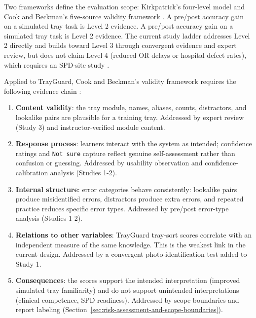 \documentclass[10pt,a4paper]{article}
\begin{document}
Two frameworks define the evaluation scope: Kirkpatrick's four-level model and Cook and Beckman's five-source validity framework \cite{kirkpatrick-evaluation-1994, cook-beckman-validity-2006}. A pre/post accuracy gain on a simulated tray task is Level 2 evidence. A pre/post accuracy gain on a simulated tray task is Level 2 evidence. The current study ladder addresses Level 2 directly and builds toward Level 3 through convergent evidence and expert review, but does not claim Level 4 (reduced OR delays or hospital defect rates), which requires an SPD-site study \cite{arthur-et-al-2003}.

Applied to TrayGuard, Cook and Beckman's validity framework requires the
following evidence chain \cite{cook-beckman-validity-2006}:
\begin{enumerate}
  \item \textbf{Content validity}: the tray module, names, aliases, counts,
  distractors, and lookalike pairs are plausible for a training tray. Addressed
  by expert review (Study 3) and instructor-verified module content.
  \item \textbf{Response process}: learners interact with the system as intended;
  confidence ratings and \texttt{Not sure} capture reflect genuine self-assessment
  rather than confusion or guessing. Addressed by usability observation and
  confidence-calibration analysis (Studies 1-2).
  \item \textbf{Internal structure}: error categories behave consistently: lookalike
  pairs produce misidentified errors, distractors produce extra errors, and
  repeated practice reduces specific error types. Addressed by pre/post error-type
  analysis (Studies 1-2).
  \item \textbf{Relations to other variables}: TrayGuard tray-sort scores correlate
  with an independent measure of the same knowledge. This is the weakest link
  in the current design. Addressed by a convergent photo-identification test
  added to Study 1.
  \item \textbf{Consequences}: the scores support the intended interpretation
  (improved simulated tray familiarity) and do not support unintended
  interpretations (clinical competence, SPD readiness). Addressed by scope
  boundaries and report labeling (Section~\ref{sec:risk-assessment-and-scope-boundaries}).
\end{enumerate}
\end{document}
